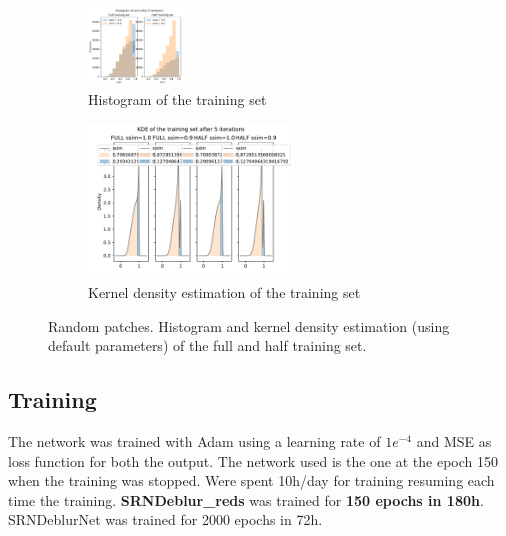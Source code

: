 \begin{enumerate}
\begin{figure}[H]
        \begin{subfigure}{\textwidth}
            \centering
            \includegraphics[width=0.3\textwidth,keepaspectratio]{subsections/srndeblur/histogram.pdf}
            \caption{Histogram of the training set}
        \end{subfigure}
        \begin{subfigure}{\textwidth}
            \centering
            \includegraphics[width=0.6\textwidth,keepaspectratio]{subsections/srndeblur/kde.pdf}
            \caption{Kernel density estimation of the training set}
            \label{kde_train}
        \end{subfigure}
        \caption{Random patches. Histogram and kernel density estimation (using default parameters) of the full and half training set.}
    \end{figure}
\end{enumerate}

\subsection{Training}
The network was trained with Adam\cite{adam} using a learning rate of $1e^{-4}$ and MSE as loss function for both the output.
The network used is the one at the epoch 150 when the training was stopped.
Were spent 10h/day for training resuming each time the training. 
\textbf{SRNDeblur\_reds} was trained for \textbf{150 epochs in {\raisebox{0.5ex}{\texttildelow}} 180h}. SRN\-DeblurNet\cite{SRN-DeblurNet} was trained for 2000 epochs in 72h. 

